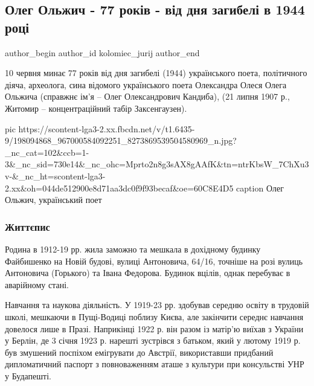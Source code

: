  
 
 
 
 
 
\subsection{Олег Ольжич - 77 років - від дня загибелі в 1944 році}
\label{sec:09_06_2021.fb.kolomiec_jurij.1.olzhych_oleg}
\ifcmt
 author_begin
   author_id kolomiec_jurij
 author_end
\fi

10 червня минає 77 років від дня загибелі (1944) українського поета,
політичного діяча, археолога, сина відомого українського поета Олександра Олеся
Олега Ольжича (справжнє ім'я – Олег Олександрович Кандиба), (21 липня 1907 р.,
Житомир – концентраційний табір Заксенгаузен).

\ifcmt
  pic https://scontent-lga3-2.xx.fbcdn.net/v/t1.6435-9/198094868_967000584092251_8273869539504580969_n.jpg?_nc_cat=102&ccb=1-3&_nc_sid=730e14&_nc_ohc=Mprto2n8g3sAX8gAAfK&tn=ntrKbsW_7ChXu3v-&_nc_ht=scontent-lga3-2.xx&oh=044de512900e8d71aa3dc0f9f93becaf&oe=60C8E4D5
	caption Олег Ольжич, український поет
\fi

\subsubsection{Життєпис}

Родина в 1912-19 рр. жила заможно та мешкала в дохідному будинку
Файбишенко на Новій будові, вулиці Антоновича, 64/16, точніше на розі вулиць
Антоновича (Горького) та Івана Федорова. Будинок вцілів, однак перебуває в
аварійному стані.

Навчання та наукова діяльність. У 1919-23 рр. здобував середню освіту в
трудовій школі, мешкаючи в Пущі-Водиці поблизу Києва, але закінчити середнє
навчання довелося лише в Празі. Наприкінці 1922 р. він разом із матір'ю виїхав
з України у Берлін, де 3 січня 1923 р. нарешті зустрівся з батьком, який у
лютому 1919 р. був змушений поспіхом емігрувати до Австрії, використавши
придбаний дипломатичний паспорт з повноваженням аташе з культури при
консульстві УНР у Будапешті.

